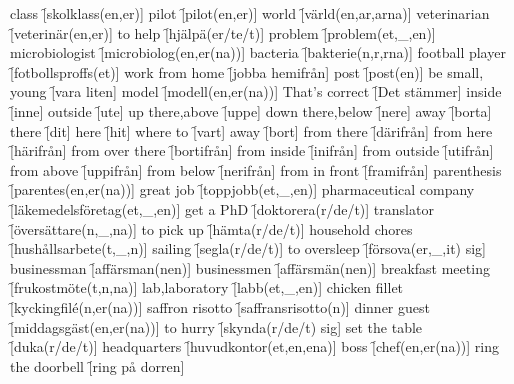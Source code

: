 \begin{questions}
    \begin{multicols}{2}
        \raggedcolumns
        \question class \f[skolklass(en,er)]
        \question pilot \f[pilot(en,er)]
        \question world \f[värld(en,ar,arna)]
        \question veterinarian \f[veterinär(en,er)]
        \question to help \f[hjälpä(er/te/t)]
        \question problem \f[problem(et,\_,en)]
        \question microbiologist \f[microbiolog(en,er(na))]
        \question bacteria \f[bakterie(n,r,rna)]
        \question football player \f[fotbollsproffs(et)]
        \question work from home \f[jobba hemifrån]
        \question post \f[post(en)]
        \question be small, young \f[vara liten]
        \question model \f[modell(en,er(na))]
        \question That's correct \f[Det stämmer]
        \question inside \f[inne]
        \question outside \f[ute]
        \question up there,above \f[uppe]
        \question down there,below \f[nere]
        \question away \f[borta]
        \question there \f[dit]
        \question here \f[hit]
        \question where to \f[vart]
        \question away \f[bort]
        \question from there \f[därifrån]
        \question from here \f[härifrån]
        \question from over there \f[bortifrån]
        \question from inside \f[inifrån]
        \question from outside \f[utifrån]
        \question from above \f[uppifrån]
        \question from below \f[nerifrån]
        \question from in front \f[framifrån]
        \question parenthesis \f[parentes(en,er(na))]
        \question great job \f[toppjobb(et,\_,en)]
        \question pharmaceutical company \f[läkemedelsföretag(et,\_,en)]
        \question get a PhD \f[doktorera(r/de/t)]
        \question translator \f[översättare(n,\_,na)]
        \question to pick up \f[hämta(r/de/t)]
        \question household chores \f[hushållsarbete(t,\_,n)]
        \question sailing \f[segla(r/de/t)]
        \question to oversleep \f[försova(er,\_,it) sig]
        \question businessman \f[affärsman(nen)]
        \question businessmen \f[affärsmän(nen)]
        \question breakfast meeting \f[frukostmöte(t,n,na)]
        \question lab,laboratory \f[labb(et,\_,en)]
        \question chicken fillet \f[kyckingfil\'e(n,er(na))]
        \question saffron risotto \f[saffransrisotto(n)]
        \question dinner guest \f[middagsgäst(en,er(na))]
        \question to hurry \f[skynda(r/de/t) sig]
        \question set the table \f[duka(r/de/t)]
        \question headquarters \f[huvudkontor(et,en,ena)]
        \question boss \f[chef(en,er(na))]
        \question ring the doorbell \f[ring på dorren]

\end{multicols}
\end{questions}
